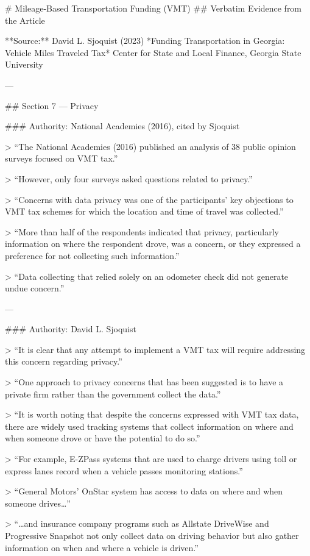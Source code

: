# Mileage-Based Transportation Funding (VMT)
## Verbatim Evidence from the Article

**Source:**
David L. Sjoquist (2023)
*Funding Transportation in Georgia: Vehicle Miles Traveled Tax*
Center for State and Local Finance, Georgia State University

---

## Section 7 — Privacy

### Authority: National Academies (2016), cited by Sjoquist

> “The National Academies (2016) published an analysis of 38 public opinion surveys focused on VMT tax.”

> “However, only four surveys asked questions related to privacy.”

> “Concerns with data privacy was one of the participants’ key objections to VMT tax schemes for which the location and time of travel was collected.”

> “More than half of the respondents indicated that privacy, particularly information on where the respondent drove, was a concern, or they expressed a preference for not collecting such information.”

> “Data collecting that relied solely on an odometer check did not generate undue concern.”

---

### Authority: David L. Sjoquist

> “It is clear that any attempt to implement a VMT tax will require addressing this concern regarding privacy.”

> “One approach to privacy concerns that has been suggested is to have a private firm rather than the government collect the data.”

> “It is worth noting that despite the concerns expressed with VMT tax data, there are widely used tracking systems that collect information on where and when someone drove or have the potential to do so.”

> “For example, E-ZPass systems that are used to charge drivers using toll or express lanes record when a vehicle passes monitoring stations.”

> “General Motors’ OnStar system has access to data on where and when someone drives…”

> “…and insurance company programs such as Allstate DriveWise and Progressive Snapshot not only collect data on driving behavior but also gather information on when and where a vehicle is driven.”

